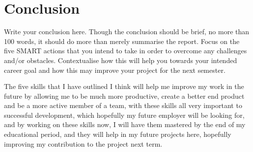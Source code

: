 \documentclass{scrartcl}
\begin{document}
\section{Conclusion}

Write your conclusion here. Though the conclusion should be brief, no more than 100 words, it should do more than merely summarise the report. Focus on the five SMART actions that you intend to take in order to overcome any challenges and/or obstacles. Contextualise how this will help you towards your intended career goal and how this may improve your project for the next semester.

The five skills that I have outlined I think will help me improve my work in the future by allowing me to be much more productive, create a better end product and be a more active member of a team, with these skills all very important to successful development, which hopefully my future employer will be looking for, and by working on these skills now, I will have them mastered by the end of my educational period, and they will help in my future projects here, hopefully improving my contribution to the project next term. 



\end{document}
